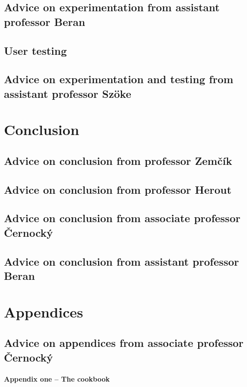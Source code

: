 \subsection*{Advice on experimentation from assistant professor Beran}

\subsection*{User testing}

\subsection*{Advice on experimentation and testing from assistant professor Szöke}

\section{Conclusion}
\label{zaverPrace}

\subsection*{Advice on conclusion from professor Zemčík}

\subsection*{Advice on conclusion from professor Herout}

\subsection*{Advice on conclusion from associate professor Černocký}

\subsection*{Advice on conclusion from assistant professor Beran}

\section{Appendices}

\subsection*{Advice on appendices from associate professor Černocký}

\paragraph{Appendix one -- The cookbook}

